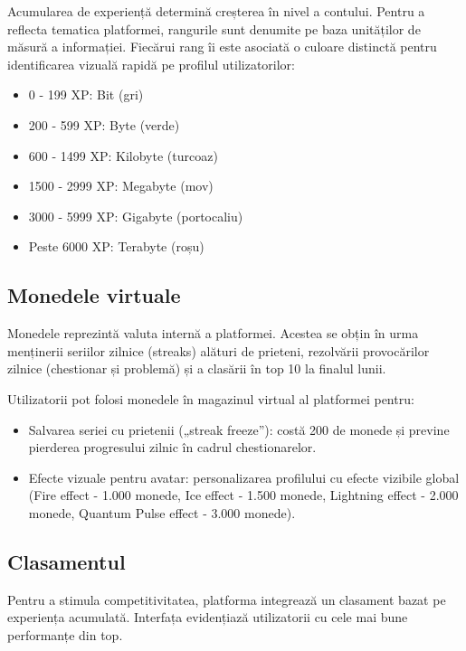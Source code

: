 Acumularea de experiență determină creșterea în nivel a contului. Pentru a reflecta tematica platformei, rangurile sunt denumite pe baza unităților de măsură a informației. Fiecărui rang îi este asociată o culoare distinctă pentru identificarea vizuală rapidă pe profilul utilizatorilor:

\begin{itemize}
    \item 0 - 199 XP: Bit (gri)
    \item 200 - 599 XP: Byte (verde)
    \item 600 - 1499 XP: Kilobyte (turcoaz)
    \item 1500 - 2999 XP: Megabyte (mov)
    \item 3000 - 5999 XP: Gigabyte (portocaliu)
    \item Peste 6000 XP: Terabyte (roșu)
\end{itemize}

\subsection{Monedele virtuale}

Monedele reprezintă valuta internă a platformei. Acestea se obțin în urma menținerii seriilor zilnice (streaks) alături de prieteni, rezolvării provocărilor zilnice (chestionar și problemă) și a clasării în top 10 la finalul lunii. 

Utilizatorii pot folosi monedele în magazinul virtual al platformei pentru: 

\begin{itemize}
    \item Salvarea seriei cu prietenii („streak freeze”): costă 200 de monede și previne pierderea progresului zilnic în cadrul chestionarelor.
    \item Efecte vizuale pentru avatar: personalizarea profilului cu efecte vizibile global (Fire effect - 1.000 monede, Ice effect - 1.500 monede, Lightning effect - 2.000 monede, Quantum Pulse effect - 3.000 monede).
\end{itemize}

\subsection{Clasamentul}

Pentru a stimula competitivitatea, platforma integrează un clasament bazat pe experiența acumulată. Interfața evidențiază utilizatorii cu cele mai bune performanțe din top. 

